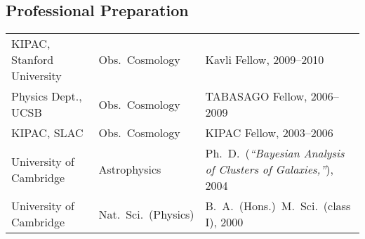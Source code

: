 \subsection*{Professional Preparation}

\begin{tabular}{@{}p{4.8cm}p{3.0cm}p{10.5cm}}
KIPAC, Stanford University &  Obs.\ Cosmology    & Kavli Fellow, 2009--2010 \\
Physics Dept., UCSB        &  Obs.\ Cosmology    & TABASAGO Fellow, 2006--2009 \\
KIPAC, SLAC                &  Obs.\ Cosmology    & KIPAC Fellow, 2003--2006 \\
University of Cambridge    &  Astrophysics               & Ph.\ D.\ (\textit{``Bayesian Analysis of Clusters of Galaxies,''}), 2004 \\
University of Cambridge    &  Nat.\ Sci.\ (Physics) & B.\ A.\ (Hons.)\, M.\ Sci.\ (class I), 2000
\end{tabular}
